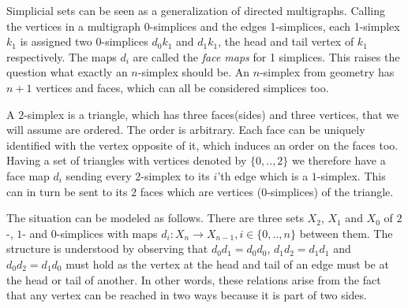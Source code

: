 \documentclass[../../main.tex]{subfiles}
\begin{document}
    
    Simplicial sets can be seen as a generalization of directed multigraphs. Calling the vertices in a multigraph 0-simplices and the edges 1-simplices, each 1-simplex $k_1$ is assigned two 0-simplices $d_0k_1$ and $d_1k_1$, the head and tail vertex of $k_1$ respectively. The maps $d_i$ are called the \emph{face maps} for 1 simplices. This raises the question what exactly an $n$-simplex should be. An $n$-simplex from geometry has $n+1$ vertices and faces, which can all be considered simplices too.

    \begin{example}[2-simplex]
        A $2$-simplex is a triangle, which has three faces(sides) and three vertices, that we will assume are ordered. The order is arbitrary. Each face can be uniquely identified with the vertex opposite of it, which induces an order on the faces too. Having a set of triangles with vertices denoted by $\{0,..,2\}$ we therefore have a face map $d_i$ sending every 2-simplex to its $i$'th edge which is a $1$-simplex. This can in turn be sent to its $2$ faces which are vertices ($0$-simplices) of the triangle. 
        
        The situation can be modeled as follows. There are three sets $X_2$, $X_1$ and $X_0$ of $2$-, $1$- and $0$-simplices with maps $d_i: X_n \to X_{n-1}, i \in \{0,.., n\}$ between them. The structure is understood by observing that $d_0d_1 = d_0d_0$, $d_1d_2 = d_1d_1$ and $d_0d_2 = d_1d_0$ must hold as the vertex at the head and tail of an edge must be at the head or tail of another. In other words, these relations arise from the fact that any vertex can be reached in two ways because it is part of two sides.

        \begin{figure}[H]
            \begin{subfigure}[b]{0.3\textwidth}
            \end{subfigure}
        \end{figure}
    \end{example}
\end{document}
